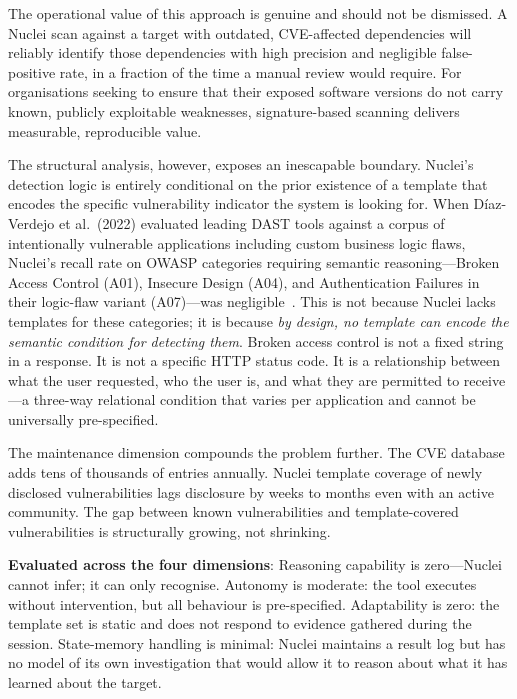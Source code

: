\documentclass[12pt,a4paper,oneside,openany]{book}
\begin{document}
The operational value of this approach is genuine and should not be dismissed. A Nuclei scan against a target with outdated, CVE-affected dependencies will reliably identify those dependencies with high precision and negligible false-positive rate, in a fraction of the time a manual review would require. For organisations seeking to ensure that their exposed software versions do not carry known, publicly exploitable weaknesses, signature-based scanning delivers measurable, reproducible value.

The structural analysis, however, exposes an inescapable boundary. Nuclei's detection logic is entirely conditional on the prior existence of a template that encodes the specific vulnerability indicator the system is looking for. When D\'{i}az-Verdejo et al.\ (2022) evaluated leading DAST tools against a corpus of intentionally vulnerable applications including custom business logic flaws, Nuclei's recall rate on OWASP categories requiring semantic reasoning---Broken Access Control (A01), Insecure Design (A04), and Authentication Failures in their logic-flaw variant (A07)---was negligible~\citep{diaz2022evaluation}. This is not because Nuclei lacks templates for these categories; it is because \textit{by design, no template can encode the semantic condition for detecting them}. Broken access control is not a fixed string in a response. It is not a specific HTTP status code. It is a relationship between what the user requested, who the user is, and what they are permitted to receive---a three-way relational condition that varies per application and cannot be universally pre-specified.

The maintenance dimension compounds the problem further. The CVE database adds tens of thousands of entries annually. Nuclei template coverage of newly disclosed vulnerabilities lags disclosure by weeks to months even with an active community. The gap between known vulnerabilities and template-covered vulnerabilities is structurally growing, not shrinking.

\textbf{Evaluated across the four dimensions}: Reasoning capability is zero---Nuclei cannot infer; it can only recognise. Autonomy is moderate: the tool executes without intervention, but all behaviour is pre-specified. Adaptability is zero: the template set is static and does not respond to evidence gathered during the session. State-memory handling is minimal: Nuclei maintains a result log but has no model of its own investigation that would allow it to reason about what it has learned about the target.
\end{document}
